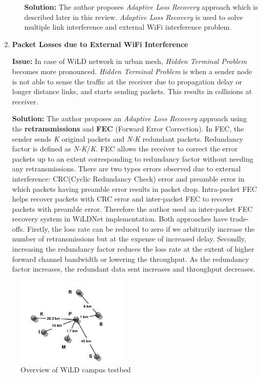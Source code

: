 \documentclass{article}
\begin{document}
\begin{enumerate}
\begin{itemize}
        \par \textbf{Solution:} The author proposes \textit{Adaptive Loss Recovery} approach which is described later in this review. \textit{Adaptive Loss Recovery} is used to solve multiple link interference and external WiFi interference problem.
    \end{itemize}{}
    \item \textbf{Packet Losses due to External WiFi Interference}
    \par \textbf{Issue:} In case of WiLD network in urban mesh, \textit{Hidden Terminal Problem} becomes more pronounced. \textit{Hidden Terminal Problem} is when a sender node is not able to sense the traffic at the receiver due to propagation delay or longer distance links, and starts sending packets. This results in collisions at receiver.
    \par \textbf{Solution:} The author proposes an \textit{Adaptive Loss Recovery} approach using the \textbf{retransmissions} and \textbf{FEC} (Forward Error Correction). In FEC, the sender sends \textit{K} original packets and \textit{N-K} redundant packets. Redundancy factor is defined as \textit{N-K}/\textit{K}. FEC allows the receiver to correct the error packets up to an extent corresponding to redundancy factor without needing any retransmissions. There are two types errors observed due to external interference: CRC(Cyclic Redundancy Check) error and preamble error in which packets having preamble error results in packet drop. Intra-packet FEC helps recover packets with CRC error and inter-packet FEC to recover packets with preamble error. Therefore the author used an inter-packet FEC recovery system in WiLDNet implementation. Both approaches have trade-offs. Firstly, the loss rate can be reduced to zero if we arbitrarily increase the number of retransmissions but at the expense of increased delay. Secondly, increasing the redundancy factor reduces the loss rate at the extent of higher forward channel bandwidth or lowering the throughput. As the redundancy factor increases, the redundant data sent increases and throughput decreases.
\end{enumerate}{}
\begin{figure}
    \begin{center}
        \includegraphics[width=0.48\textwidth]{campus_w.png}
    \end{center}{}
    \caption{Overview of WiLD campus testbed}
\end{figure}
\end{document}
